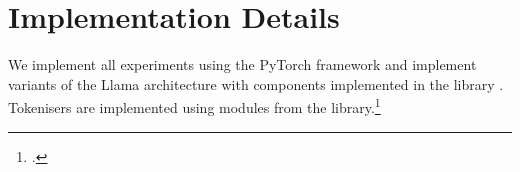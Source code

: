 


\section{Implementation Details}
\label{app:implementation_details}

We implement all experiments using the PyTorch framework \citep{paszke-etal-2019-pytorch} and implement variants of the Llama architecture with components implemented in the  library \citep{wolf-etal-2020-transformers}. Tokenisers are implemented using modules from the  library.\footnote{\href{https://github.com/huggingface/tokenizers}{}.}




